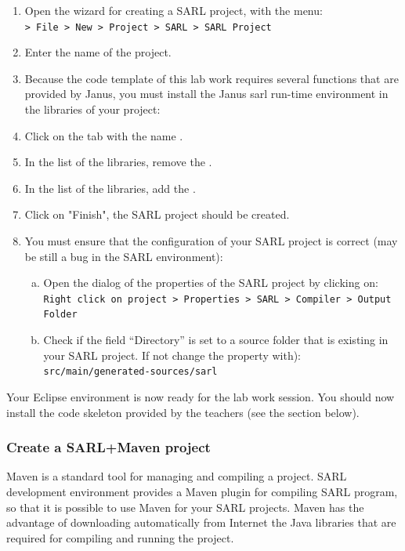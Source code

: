 \begin{enumerate}
\item Open the wizard for creating a SARL project, with the menu: \\
	\texttt{> File > New > Project > SARL > SARL Project}
\item Enter the name of the project.
\ifJANUSINCLASSPATH
\item Because the code template of this lab work requires several functions that are provided by Janus, you must install the Janus sarl run-time environment in the libraries of your project:
	\item Click on the tab with the name .
	\item In the list of the libraries, remove the .
	\item In the list of the libraries, add the .
\fi
\item Click on "Finish", the SARL project should be created.
\item You must ensure that the configuration of your SARL project is correct (may be still a bug in the SARL environment):
	\begin{enumerate}[a)]
	\item Open the dialog of the properties of the SARL project by clicking on: \\
		\texttt{Right click on project > Properties > SARL > Compiler > Output Folder}
	\item Check if the field ``Directory'' is set to a source folder that is existing in your SARL project. If not change the property with): \\
		\texttt{src/main/generated-sources/sarl}
	\end{enumerate}
\end{enumerate}

Your Eclipse environment is now ready for the lab work session.
\ifCODESKELETON
You should now install the code skeleton provided by the teachers (see the section below).
\fi

\subsubsection{Create a SARL+Maven project}\label{section:createsarlmavenproject}

Maven is a standard tool for managing and compiling a project. SARL development environment provides a Maven plugin for compiling SARL program, so that it is possible to use Maven for your SARL projects.
Maven has the advantage of downloading automatically from Internet the Java libraries that are required for compiling and running the project.

